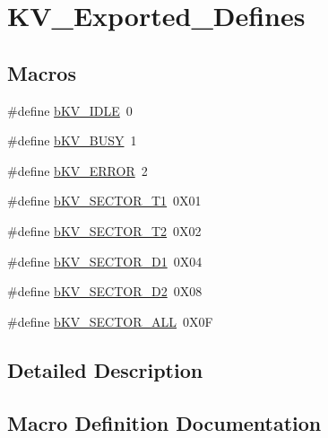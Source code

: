 \hypertarget{group___k_v___exported___defines}{}\section{K\+V\+\_\+\+Exported\+\_\+\+Defines}
\label{group___k_v___exported___defines}
\subsection*{Macros}
\begin{DoxyCompactItemize}
\item 
\#define \mbox{\hyperlink{group___k_v___exported___defines_gad35428baad0145338fac35174a24cfd9}{b\+K\+V\+\_\+\+I\+D\+LE}}~0
\item 
\#define \mbox{\hyperlink{group___k_v___exported___defines_ga663b3efa83f9243ace5105a1c124319b}{b\+K\+V\+\_\+\+B\+U\+SY}}~1
\item 
\#define \mbox{\hyperlink{group___k_v___exported___defines_ga7a4becc6356e8e8ff1cb311551d5c132}{b\+K\+V\+\_\+\+E\+R\+R\+OR}}~2
\item 
\#define \mbox{\hyperlink{group___k_v___exported___defines_ga9b8339a656229abce501856a1acc4992}{b\+K\+V\+\_\+\+S\+E\+C\+T\+O\+R\+\_\+\+T1}}~0\+X01
\item 
\#define \mbox{\hyperlink{group___k_v___exported___defines_gaf444d6a88d8d3a7f6a36f22e10defe4b}{b\+K\+V\+\_\+\+S\+E\+C\+T\+O\+R\+\_\+\+T2}}~0\+X02
\item 
\#define \mbox{\hyperlink{group___k_v___exported___defines_gaa67df877802f002bc2f3e7806415b0ee}{b\+K\+V\+\_\+\+S\+E\+C\+T\+O\+R\+\_\+\+D1}}~0\+X04
\item 
\#define \mbox{\hyperlink{group___k_v___exported___defines_ga1dfd30143d7630349b1268ac41cda9e7}{b\+K\+V\+\_\+\+S\+E\+C\+T\+O\+R\+\_\+\+D2}}~0\+X08
\item 
\#define \mbox{\hyperlink{group___k_v___exported___defines_gaa90ff7ecee803e335df09c3cd4944e0d}{b\+K\+V\+\_\+\+S\+E\+C\+T\+O\+R\+\_\+\+A\+LL}}~0\+X0F
\end{DoxyCompactItemize}


\subsection{Detailed Description}


\subsection{Macro Definition Documentation}
\mbox{\label{group___k_v___exported___defines_ga663b3efa83f9243ace5105a1c124319b}} 

